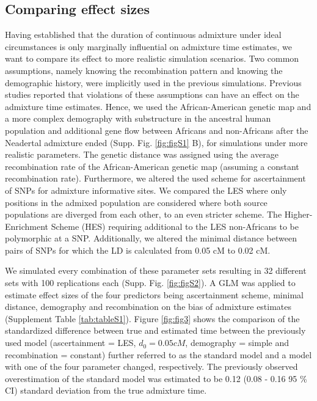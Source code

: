 \documentclass[]{article}
\begin{document}
\subsection{Comparing effect sizes}\label{comparing effect sizes}

Having established that the duration of continuous admixture under ideal
circumstances is only marginally influential on admixture time
estimates, we want to compare its effect to more realistic simulation scenarios. Two common assumptions, namely knowing the recombination pattern and knowing the demographic history, were implicitly used in the previous simulations.
Previous studies reported that violations of these assumptions can have an effect on the admixture time estimates.
Hence, we used the African-American genetic map and a more complex demography with substructure in the ancestral human population and additional gene flow between Africans and non-Africans after the Neadertal admixture ended (Supp. Fig. \ref{fig:figS1} B), for simulations under more realistic parameters. The genetic distance was assigned using the average recombination rate of the African-American genetic map (assuming a constant recombination rate).
Furthermore, we altered the used scheme for ascertainment of SNPs for admixture informative sites. We compared the LES where only
positions in the admixed population are considered where both source
populations are diverged from each other, to an even stricter scheme. The Higher-Enrichment Scheme (HES) requiring additional
to the LES non-Africans to be polymorphic at a SNP. Additionally, we altered the minimal distance between pairs of SNPs for which the LD is calculated from 0.05 cM to 0.02 cM.



We simulated every combination of these parameter sets resulting in 32
different sets with 100 replications each (Supp. Fig. \ref{fig:figS2}).
A GLM was applied to estimate effect sizes of the four predictors being
ascertainment scheme, minimal distance, demography and recombination on
the bias of admixture estimates (Supplement Table \ref{tab:tableS1}).
Figure \ref{fig:fig3} shows the comparison of the standardized
difference between true and estimated time between the previously used
model (ascertainment = LES, \(d_{0} = 0.05 cM\), demography = simple and
recombination = constant) further referred to as the standard model and
a model with one of the four parameter changed, respectively. The
previously observed overestimation of the standard model was estimated
to be 0.12 (0.08 - 0.16 95 \% CI) standard deviation from the true
admixture time.
\end{document}
